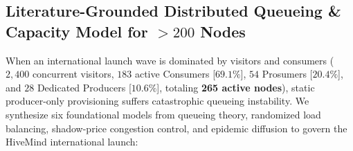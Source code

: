 \documentclass[11pt,a4paper]{article}
\begin{document}
\subsection{Literature-Grounded Distributed Queueing \& Capacity Model for $>200$ Nodes}
\label{sec:literature_queueing_model}

When an international launch wave is dominated by visitors and consumers ($2{,}400$ concurrent visitors, $183$ active Consumers [$69.1\%$], $54$ Prosumers [$20.4\%$], and $28$ Dedicated Producers [$10.6\%$], totaling \textbf{265 active nodes}), static producer-only provisioning suffers catastrophic queueing instability. We synthesize six foundational models from queueing theory, randomized load balancing, shadow-price congestion control, and epidemic diffusion to govern the HiveMind international launch:
\end{document}
